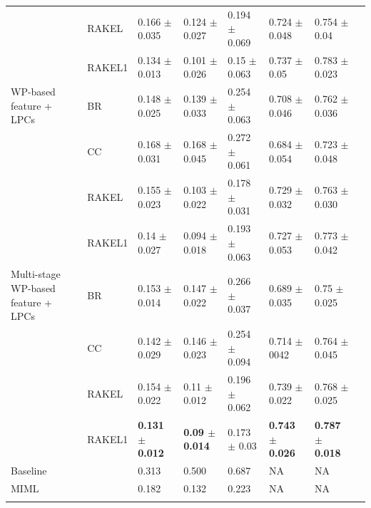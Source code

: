 \begin{table}[htb!]
{\begin{tabular}{llllllll}
                          & RAKEL           & 0.166 $\pm$ 0.035           & 0.124 $\pm$ 0.027         & 0.194 $\pm$ 0.069        & 0.724 $\pm$ 0.048                & 0.754 $\pm$ 0.04        \\ 
                          & RAKEL1           & 0.134 $\pm$ 0.013           & 0.101 $\pm$ 0.026        & 0.15 $\pm$ 0.063         & 0.737 $\pm$ 0.05                 & 0.783 $\pm$ 0.023       \\ 
WP-based feature + LPCs             & BR              & 0.148 $\pm$ 0.025           & 0.139 $\pm$ 0.033      & 0.254 $\pm$ 0.063        & 0.708 $\pm$ 0.046                & 0.762 $\pm$ 0.036       \\ 
                          & CC              & 0.168 $\pm$ 0.031           & 0.168 $\pm$ 0.045        & 0.272 $\pm$ 0.061        & 0.684 $\pm$ 0.054                & 0.723 $\pm$ 0.048       \\ 
                          & RAKEL           & 0.155 $\pm$ 0.023           & 0.103 $\pm$ 0.022        & 0.178 $\pm$ 0.031        & 0.729 $\pm$ 0.032                & 0.763 $\pm$ 0.030       \\ 
                          & RAKEL1           & 0.14 $\pm$ 0.027            & 0.094 $\pm$ 0.018         & 0.193 $\pm$ 0.063        & 0.727 $\pm$ 0.053                & 0.773 $\pm$ 0.042       \\ 
Multi-stage WP-based feature + LPCs & BR              & 0.153 $\pm$ 0.014           & 0.147 $\pm$ 0.022      & 0.266 $\pm$ 0.037        & 0.689 $\pm$ 0.035                & 0.75 $\pm$ 0.025        \\ 
                          & CC              & 0.142 $\pm$ 0.029           & 0.146 $\pm$ 0.023        & 0.254 $\pm$ 0.094        & 0.714 $\pm$ 0042                 & 0.764 $\pm$ 0.045       \\ 
                          & RAKEL           & 0.154 $\pm$ 0.022           & 0.11 $\pm$ 0.012         & 0.196 $\pm$ 0.062        & 0.739 $\pm$ 0.022                & 0.768 $\pm$ 0.025       \\ 
                          & RAKEL1           & \textbf{0.131 $\pm$ 0.012          } & \textbf{0.09 $\pm$ 0.014}                       & 0.173 $\pm$ 0.03         & \textbf{0.743 $\pm$ 0.026}               & \textbf{0.787 $\pm$ 0.018}      
\\ \hline
Baseline &               & 0.313           & 0.500      & 0.687        & NA                & NA
\\ \hline
MIML & &    0.182           & 0.132      & 0.223        & NA                & NA                        
                          
                          
                           \\ \hhline{========}
\end{tabular}
}
\end{table}




